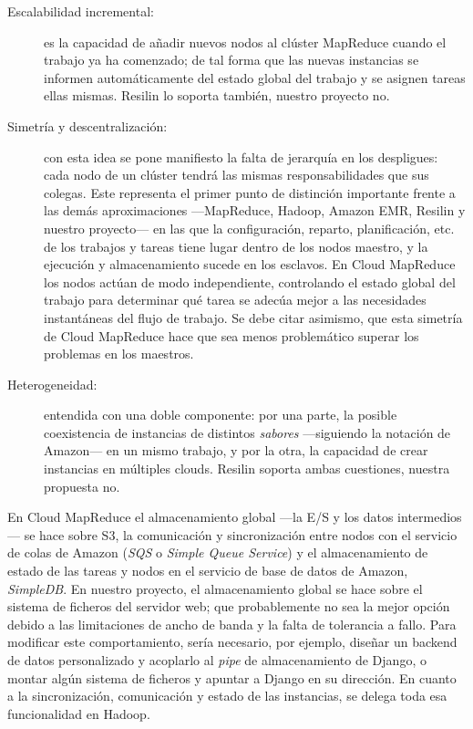 \begin{description}
\item[Escalabilidad incremental:] es la capacidad de a\~nadir nuevos nodos al cl\'uster MapReduce cuando el trabajo ya ha comenzado; de tal forma que las nuevas instancias se informen autom\'aticamente del estado global del trabajo y se asignen tareas ellas mismas. Resilin \cite{resilin} lo soporta tambi\'en, nuestro proyecto no.
\item[Simetr\'ia y descentralizaci\'on:] con esta idea se pone manifiesto la falta de jerarqu\'ia en los despligues: cada nodo de un cl\'uster tendr\'a las mismas responsabilidades que sus colegas. Este representa el primer punto de distinci\'on importante frente a las dem\'as aproximaciones ---MapReduce, Hadoop, Amazon EMR, Resilin y nuestro proyecto--- en las que la configuraci\'on, reparto, planificaci\'on, etc. de los trabajos y tareas tiene lugar dentro de los nodos maestro, y la ejecuci\'on y almacenamiento sucede en los esclavos. En Cloud MapReduce los nodos act\'uan de modo independiente, controlando el estado global del trabajo para determinar qu\'e tarea se adec\'ua mejor a las necesidades instant\'aneas del flujo de trabajo. Se debe citar asimismo, que esta simetr\'ia de Cloud MapReduce hace que sea menos problem\'atico superar los problemas en los maestros.
\item[Heterogeneidad:] entendida con una doble componente: por una parte, la posible coexistencia de instancias de distintos \emph{sabores} ---siguiendo la notaci\'on de Amazon--- en un mismo trabajo, y por la otra, la capacidad de crear instancias en m\'ultiples clouds. Resilin soporta ambas cuestiones, nuestra propuesta no.
\end{description}

En Cloud MapReduce el almacenamiento global ---la E/S y los datos intermedios--- se hace sobre S3, la comunicaci\'on y sincronizaci\'on entre nodos con el servicio de colas de Amazon (\emph{SQS} o \emph{Simple Queue Service}) y el almacenamiento de estado de las tareas y nodos en el servicio de base de datos de Amazon, \emph{SimpleDB}. En nuestro proyecto, el almacenamiento global se hace sobre el sistema de ficheros del servidor web; que probablemente no sea la mejor opci\'on debido a las limitaciones de ancho de banda y la falta de tolerancia a fallo. Para modificar este comportamiento, ser\'ia necesario, por ejemplo, dise\~nar un backend de datos personalizado y acoplarlo al \emph{pipe} de almacenamiento de Django, o montar alg\'un sistema de ficheros y apuntar a Django en su direcci\'on. En cuanto a la sincronizaci\'on, comunicaci\'on y estado de las instancias, se delega toda esa funcionalidad en Hadoop.\newline


